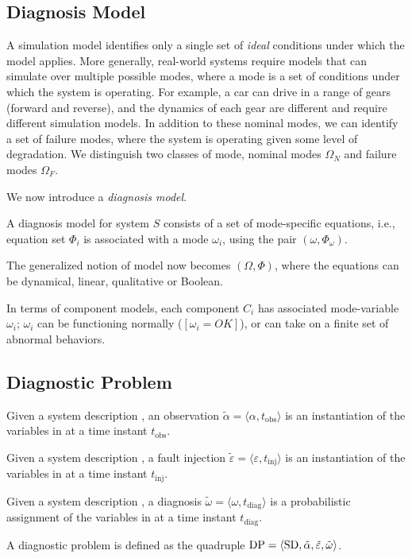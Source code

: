 \subsection{Diagnosis Model}

A simulation model identifies only a single set of \textit{ideal}
conditions under which the model applies. More generally, real-world
systems require models that can simulate over multiple possible modes,
where a mode is a set of conditions under which the system is
operating. For example, a car can drive in a range of gears (forward
and reverse), and the dynamics of each gear are different and require
different simulation models. In addition to these nominal modes, we
can identify a set of failure modes, where the system is operating
given some level of degradation.  We distinguish two classes of mode,
nominal modes ${\Omega}_N$ and failure modes ${\Omega}_F$.


We now introduce a \textit{diagnosis model}.  
 

\begin{definition}
A diagnosis model for system $S$ consists of a set of mode-specific
equations, i.e., equation set $\Phi_i$ is associated with a mode
$\omega_i$, using the pair $(\omega,{\Phi}_{\omega})$.
\end{definition}

The generalized notion of model now becomes $({\Omega},{\Phi})$, where
the equations can be dynamical, linear, qualitative or Boolean.

In terms of component models, each component $C_i$ has associated
mode-variable $\omega_i$; $\omega_i$ can be functioning normally
($[\omega_i = OK]$), or can take on a finite set of abnormal
behaviors.

\subsection{Diagnostic Problem}
%
\begin{definition}[Observation]
%
Given a system description \sd, an observation $\tilde\alpha =
\langle\alpha, t_{\mathrm{obs}}\rangle$ is an instantiation of the
variables in \obs at a time instant $t_{\mathrm{obs}}$.
%
\end{definition}
%
\begin{definition}
%
Given a system description \sd, a fault injection $\tilde{\varepsilon}
= \langle\varepsilon, t_{\mathrm{inj}}\rangle$ is an instantiation of
the variables in \comps at a time instant $t_{\mathrm{inj}}$.
%
\end{definition}
%
\begin{definition}[Diagnosis]
%
Given a system description \sd, a diagnosis $\tilde{\omega} =
\langle\omega, t_{\mathrm{diag}}\rangle$ is a probabilistic assignment
of the variables in \comps at a time instant $t_{\mathrm{diag}}$.
%
\end{definition}
%
\begin{definition}
%
A diagnostic problem \dproblem is defined as the quadruple $\mathrm{DP}
= \langle\mathrm{SD}, \tilde{\alpha}, \tilde{\varepsilon},
\tilde{\omega}\rangle$.
%
\end{definition}
%
